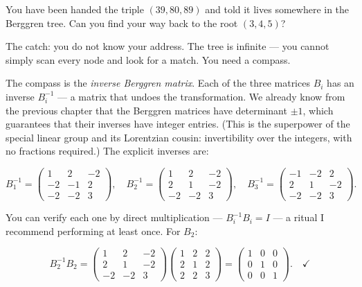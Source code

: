 \documentclass[11pt,openany]{book}
\theoremstyle{definition}
\theoremstyle{plain}
\theoremstyle{remark}
\begin{document}
You have been handed the triple $(39, 80, 89)$ and told it lives somewhere in the Berggren tree. Can you find your way back to the root $(3, 4, 5)$?

The catch: you do not know your address. The tree is infinite — you cannot simply scan every node and look for a match. You need a compass.

The compass is the \textit{inverse Berggren matrix}. Each of the three matrices $B_i$ has an inverse $B_i^{-1}$ — a matrix that undoes the transformation. We already know from the previous chapter that the Berggren matrices have determinant $\pm 1$, which guarantees that their inverses have integer entries. (This is the superpower of the special linear group and its Lorentzian cousin: invertibility over the integers, with no fractions required.) The explicit inverses are:

$$B_1^{-1} = \begin{pmatrix} 1 & 2 & -2 \\ -2 & -1 & 2 \\ -2 & -2 & 3 \end{pmatrix}, \quad B_2^{-1} = \begin{pmatrix} 1 & 2 & -2 \\ 2 & 1 & -2 \\ -2 & -2 & 3 \end{pmatrix}, \quad B_3^{-1} = \begin{pmatrix} -1 & -2 & 2 \\ 2 & 1 & -2 \\ -2 & -2 & 3 \end{pmatrix}.$$

You can verify each one by direct multiplication — $B_i^{-1} B_i = I$ — a ritual I recommend performing at least once. For $B_2$:

$$B_2^{-1} B_2 = \begin{pmatrix} 1 & 2 & -2 \\ 2 & 1 & -2 \\ -2 & -2 & 3 \end{pmatrix} \begin{pmatrix} 1 & 2 & 2 \\ 2 & 1 & 2 \\ 2 & 2 & 3 \end{pmatrix} = \begin{pmatrix} 1 & 0 & 0 \\ 0 & 1 & 0 \\ 0 & 0 & 1 \end{pmatrix}. \quad \checkmark$$
\end{document}
